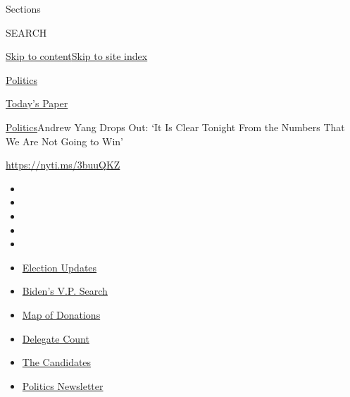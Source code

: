 Sections

SEARCH

\protect\hyperlink{site-content}{Skip to
content}\protect\hyperlink{site-index}{Skip to site index}

\href{https://www.nytimes.com/section/politics}{Politics}

\href{https://myaccount.nytimes.com/auth/login?response_type=cookie\&client_id=vi}{}

\href{https://www.nytimes.com/section/todayspaper}{Today's Paper}

\href{/section/politics}{Politics}\textbar{}Andrew Yang Drops Out: `It
Is Clear Tonight From the Numbers That We Are Not Going to Win'

\url{https://nyti.ms/3buuQKZ}

\begin{itemize}
\item
\item
\item
\item
\item
\end{itemize}

\begin{itemize}
\item
  \href{https://www.nytimes.com/2020/07/31/us/elections/biden-vs-trump.html?action=click\&pgtype=Article\&state=default\&region=TOP_BANNER\&context=storylines_menu}{Election
  Updates}
\item
  \href{https://www.nytimes.com/article/biden-vice-president-2020.html?action=click\&pgtype=Article\&state=default\&region=TOP_BANNER\&context=storylines_menu}{Biden's
  V.P. Search}
\item
  \href{https://www.nytimes.com/interactive/2020/07/24/us/politics/trump-biden-campaign-donors.html?action=click\&pgtype=Article\&state=default\&region=TOP_BANNER\&context=storylines_menu}{Map
  of Donations}
\item
  \href{https://www.nytimes.com/interactive/2020/us/elections/delegate-count-primary-results.html?action=click\&pgtype=Article\&state=default\&region=TOP_BANNER\&context=storylines_menu}{Delegate
  Count}
\item
  \href{https://www.nytimes.com/interactive/2019/us/politics/2020-presidential-candidates.html?action=click\&pgtype=Article\&state=default\&region=TOP_BANNER\&context=storylines_menu}{The
  Candidates}
\item
  \href{https://www.nytimes.com/newsletters/politics?action=click\&pgtype=Article\&state=default\&region=TOP_BANNER\&context=storylines_menu}{Politics
  Newsletter}
\end{itemize}

